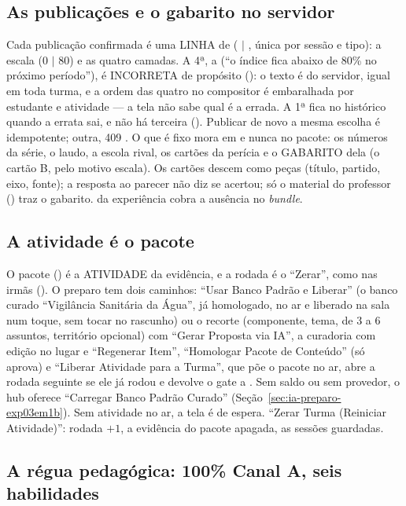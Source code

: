 \subsection{As publicações e o gabarito no servidor}

Cada publicação confirmada é uma LINHA de 
( $|$ , única por sessão e tipo): a escala (0 $|$ 80) e
as quatro camadas. A 4ª, a  (\enquote{o índice fica abaixo de
80\% no próximo período}), é INCORRETA de propósito (): o texto
é do servidor, igual em toda turma, e a ordem das quatro no compositor é
embaralhada por estudante e atividade --- a tela não sabe qual é a errada. A 1ª fica no histórico quando a errata sai, e não há
terceira (). Publicar de novo a mesma escolha é idempotente;
outra, 409 . O que é fixo mora em  e nunca
no pacote: os números da série, o laudo, a escola rival, os cartões da
perícia e o GABARITO dela (o cartão B, pelo motivo escala). Os cartões descem
como peças (título, partido, eixo, fonte); a resposta ao parecer não diz se
acertou; só o material do professor ()
traz o gabarito.  da experiência cobra a ausência
no \emph{bundle}.

\subsection{A atividade é o pacote}

O pacote () é a ATIVIDADE da evidência, e a rodada é
o \enquote{Zerar}, como nas irmãs (). O preparo tem dois
caminhos: \enquote{Usar Banco Padrão e Liberar} (o banco curado
\enquote{Vigilância Sanitária da Água}, já homologado, no ar e liberado na
sala num toque, sem tocar no rascunho) ou o recorte (componente, tema, de 3 a
6 assuntos, território opcional) com \enquote{Gerar Proposta via IA}, a
curadoria com edição no lugar e \enquote{Regenerar Item},
\enquote{Homologar Pacote de Conteúdo} (só aprova) e \enquote{Liberar
Atividade para a Turma}, que põe o pacote no ar, abre a rodada seguinte se
ele já rodou e devolve o gate a . Sem saldo ou sem provedor,
o hub oferece \enquote{Carregar Banco Padrão Curado}
(Seção~\ref{sec:ia-preparo-exp03em1b}). Sem atividade no ar, a tela é de
espera. \enquote{Zerar Turma (Reiniciar Atividade)}: rodada $+1$, a evidência
do pacote apagada, as sessões guardadas.

\subsection{A régua pedagógica: 100\% Canal A, seis habilidades}


